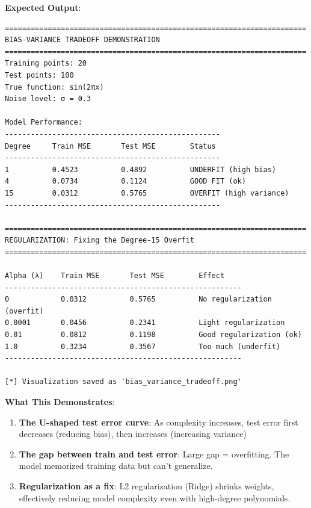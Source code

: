 \documentclass[11pt,oneside]{book}
\begin{document}
\textbf{Expected Output}:
\begin{lstlisting}[style=outputstyle]
======================================================================
BIAS-VARIANCE TRADEOFF DEMONSTRATION
======================================================================
Training points: 20
Test points: 100
True function: sin(2πx)
Noise level: σ = 0.3

Model Performance:
--------------------------------------------------
Degree     Train MSE       Test MSE        Status
--------------------------------------------------
1          0.4523          0.4892          UNDERFIT (high bias)
4          0.0734          0.1124          GOOD FIT (ok)
15         0.0312          0.5765          OVERFIT (high variance)
--------------------------------------------------

======================================================================
REGULARIZATION: Fixing the Degree-15 Overfit
======================================================================

Alpha (λ)    Train MSE       Test MSE        Effect
-------------------------------------------------------
0            0.0312          0.5765          No regularization (overfit)
0.0001       0.0456          0.2341          Light regularization
0.01         0.0812          0.1198          Good regularization (ok)
1.0          0.3234          0.3567          Too much (underfit)
-------------------------------------------------------

[*] Visualization saved as 'bias_variance_tradeoff.png'
\end{lstlisting}

\textbf{What This Demonstrates}:

\begin{enumerate}
    \item \textbf{The U-shaped test error curve}: As complexity increases, test error first decreases (reducing bias), then increases (increasing variance)

    \item \textbf{The gap between train and test error}: Large gap = overfitting. The model memorized training data but can't generalize.

    \item \textbf{Regularization as a fix}: L2 regularization (Ridge) shrinks weights, effectively reducing model complexity even with high-degree polynomials.
\end{enumerate}
\end{document}
